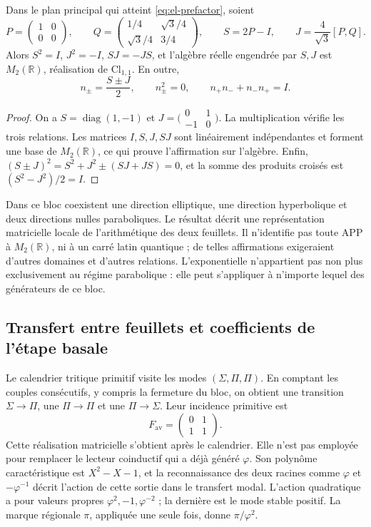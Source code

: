 \begin{proposition}
Dans le plan principal qui atteint \eqref{eq:el-prefactor}, soient
\[
 P=\begin{pmatrix}1&0\\0&0\end{pmatrix},\qquad
 Q=\begin{pmatrix}1/4&\sqrt3/4\\\sqrt3/4&3/4\end{pmatrix},\qquad
 S=2P-I,\qquad J=\frac4{\sqrt3}[P,Q].
\]
Alors \(S^2=I\), \(J^2=-I\), \(SJ=-JS\), et l'algèbre réelle engendrée par \(S,J\) est \(M_2(\mathbb R)\), réalisation de \(\mathrm{Cl}_{1,1}\). En outre,
\[
 n_\pm=\frac{S\pm J}{2},\qquad
 n_\pm^2=0,\qquad n_+n_-+n_-n_+=I.
\]
\end{proposition}
\begin{proof}
On a \(S=\operatorname{diag}(1,-1)\) et
\(J=\bigl(\begin{smallmatrix}0&1\\-1&0\end{smallmatrix}\bigr)\).
La multiplication vérifie les trois relations. Les matrices \(I,S,J,SJ\) sont linéairement indépendantes et forment une base de \(M_2(\mathbb R)\), ce qui prouve l'affirmation sur l'algèbre. Enfin, \((S\pm J)^2=S^2+J^2\pm(SJ+JS)=0\), et la somme des produits croisés est \((S^2-J^2)/2=I\).
\end{proof}

Dans ce bloc coexistent une direction elliptique, une direction hyperbolique et deux
directions nulles paraboliques. Le résultat décrit une représentation
matricielle locale de l'arithmétique des deux feuillets. Il n'identifie pas toute APP
à \(M_2(\mathbb R)\), ni à un carré latin quantique ; de telles
affirmations exigeraient d'autres domaines et d'autres relations. L'exponentielle
n'appartient pas non plus exclusivement au régime parabolique : elle peut
s'appliquer à n'importe lequel des générateurs de ce bloc.

\subsection{Transfert entre feuillets et coefficients de l'étape basale}

Le calendrier tritique primitif visite les modes
\((\Sigma,\Pi,\Pi)\). En comptant les couples consécutifs, y compris la
fermeture du bloc, on obtient une transition \(\Sigma\to\Pi\), une
\(\Pi\to\Pi\) et une \(\Pi\to\Sigma\). Leur incidence primitive est
\[
 F_{\mathrm{av}}=\begin{pmatrix}0&1\\1&1\end{pmatrix}.
\]
Cette réalisation matricielle s'obtient après le calendrier. Elle n'est pas employée pour remplacer le lecteur coinductif qui a déjà généré \(\varphi\). Son polynôme caractéristique est \(X^2-X-1\), et la reconnaissance des deux racines comme \(\varphi\) et \(-\varphi^{-1}\) décrit l'action de cette sortie dans le transfert modal. L'action quadratique a pour valeurs propres \(\varphi^2,-1,\varphi^{-2}\) ; la dernière est le mode stable positif. La marque régionale \(\pi\), appliquée une seule fois, donne \(\pi/\varphi^2\).

